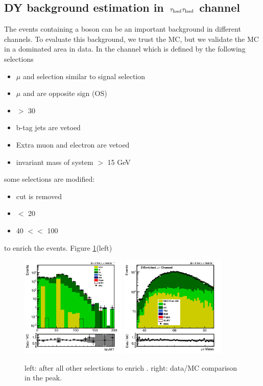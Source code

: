 \subsection{\texorpdfstring{DY background estimation in $\,\tau_{\rm had}\tau_{\rm had}$ channel}{DY background estimation in tau-tau channel}}
The events containing a \Z boson can be an important background in different channels. To evaluate this background, we trust 
the MC, but we validate the MC in a \Z dominated area in data. In the \muTau channel which is defined by the following selections 
\begin{itemize}
\item $\mu$ and \Tau selection similar to signal selection
\item $\mu$ and \Tau are opposite sign (OS)
\item \MET $>$ 30 
\item b-tag jets are vetoed
\item Extra muon and electron are vetoed 
\item invariant mass of \muTau system $>$ 15 GeV
\end{itemize}
some selections are modified:
\begin{itemize}
\item \mindphifour cut is removed
\item \mttwo $<$ 20 \GeV
\item 40 $<$\tauMT $<$ 100 \GeV
\end{itemize}
to enrich the \Z events. Figure \ref{fig:ZValidation}(left)
\begin{figure}[h]
\centering
\includegraphics[width=0.45\textwidth,keepaspectratio=true]{ZValidation/tauMT_ZValidation.png}
\includegraphics[width=0.45\textwidth,keepaspectratio=true]{ZValidation/InvMass_ZValidation.png}
\caption{left: \tauMT after all other selections to enrich \Z. right: data/MC comparison in the \Z peak.}
\label{fig:ZValidation}
\end{figure}
